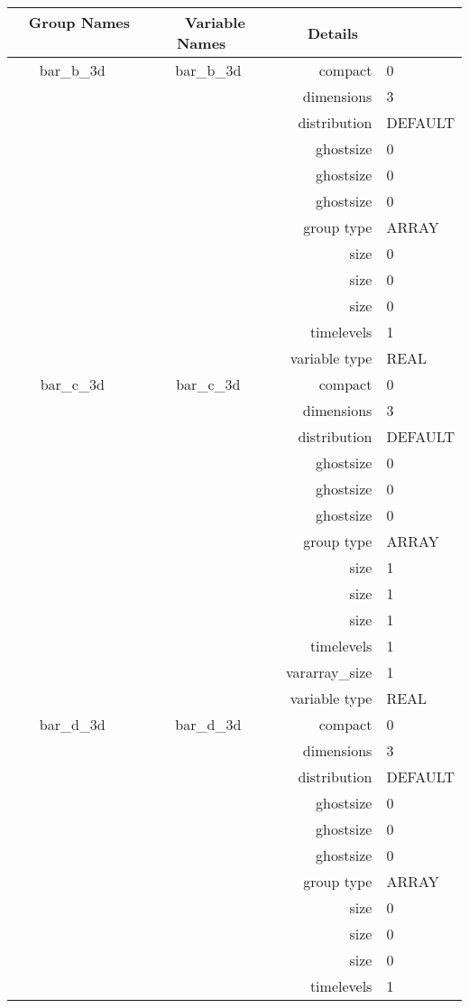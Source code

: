 \begin{tabular*}{150mm}{|c|c@{\extracolsep{\fill}}|rl|} \hline 
~ {\bf Group Names} ~ & ~ {\bf Variable Names} ~  &{\bf Details} ~ & ~ \\ 
\hline 
bar\_b\_3d & bar\_b\_3d & compact & 0 \\ 
 &  & dimensions & 3 \\ 
 &  & distribution & DEFAULT \\ 
 &  & ghostsize & 0 \\ 
& ~ & ghostsize & 0 \\ 
 &  & ghostsize & 0 \\ 
 &  & group type & ARRAY \\ 
 &  & size & 0 \\ 
& ~ & size & 0 \\ 
 &  & size & 0 \\ 
 &  & timelevels & 1 \\ 
 &  & variable type & REAL \\ 
\hline 
bar\_c\_3d & bar\_c\_3d & compact & 0 \\ 
 &  & dimensions & 3 \\ 
 &  & distribution & DEFAULT \\ 
 &  & ghostsize & 0 \\ 
& ~ & ghostsize & 0 \\ 
 &  & ghostsize & 0 \\ 
 &  & group type & ARRAY \\ 
 &  & size & 1 \\ 
& ~ & size & 1 \\ 
 &  & size & 1 \\ 
 &  & timelevels & 1 \\ 
 &  & vararray\_size & 1 \\ 
 &  & variable type & REAL \\ 
\hline 
bar\_d\_3d & bar\_d\_3d & compact & 0 \\ 
 &  & dimensions & 3 \\ 
 &  & distribution & DEFAULT \\ 
 &  & ghostsize & 0 \\ 
& ~ & ghostsize & 0 \\ 
 &  & ghostsize & 0 \\ 
 &  & group type & ARRAY \\ 
 &  & size & 0 \\ 
& ~ & size & 0 \\ 
 &  & size & 0 \\ 
 &  & timelevels & 1 \\ 

\end{tabular*}
